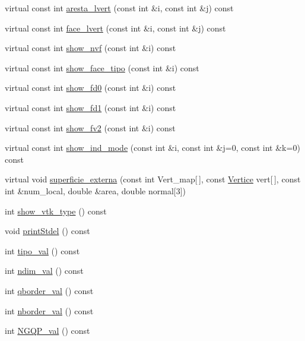 \begin{DoxyCompactItemize}
\item 
virtual const int \hyperlink{classTriangle_a55b14526652cdeaff82e07083c36a7ba}{aresta\+\_\+lvert} (const int \&i, const int \&j) const
\item 
virtual const int \hyperlink{classTriangle_a54ef3345b002746852e4f2eb2f698ae2}{face\+\_\+lvert} (const int \&i, const int \&j) const
\item 
virtual const int \hyperlink{classTriangle_ad028de34010b57e995d0206f9257b37b}{show\+\_\+nvf} (const int \&i) const
\item 
virtual const int \hyperlink{classTriangle_a7f711afd182aa8bae52c8acfa4ce3690}{show\+\_\+face\+\_\+tipo} (const int \&i) const
\item 
virtual const int \hyperlink{classTriangle_a715ce8022208f6b23e980acced093e99}{show\+\_\+fd0} (const int \&i) const
\item 
virtual const int \hyperlink{classTriangle_a3635411b31e3fe7dbe226efe5de45094}{show\+\_\+fd1} (const int \&i) const
\item 
virtual const int \hyperlink{classTriangle_a89169103df31e2cbe4383617363e48de}{show\+\_\+fv2} (const int \&i) const
\item 
virtual const int \hyperlink{classTriangle_ac61acf91a02fd588a70bf75d3e246129}{show\+\_\+ind\+\_\+mode} (const int \&i, const int \&j=0, const int \&k=0) const
\item 
virtual void \hyperlink{classTriangle_a1067d23aa0cc1580d0deed90f4cf3d37}{superficie\+\_\+externa} (const int Vert\+\_\+map\mbox{[}$\,$\mbox{]}, const \hyperlink{structVertice}{Vertice} vert\mbox{[}$\,$\mbox{]}, const int \&num\+\_\+local, double \&area, double normal\mbox{[}3\mbox{]})
\item 
int \hyperlink{classStdel_a56288a857b95a55c8b7eb5b473e836d9}{show\+\_\+vtk\+\_\+type} () const
\item 
void \hyperlink{classStdel_a54b5768d09f500cb949e66fc234eac70}{print\+Stdel} () const
\item 
int \hyperlink{classStdel_a75023fc369db2752845a9ce278f10929}{tipo\+\_\+val} () const
\item 
int \hyperlink{classStdel_a383df930bee8dc298d7d412b3b632ebb}{ndim\+\_\+val} () const
\item 
int \hyperlink{classStdel_a457d20e34fb7a32eb1e4aca6c19f53a2}{qborder\+\_\+val} () const
\item 
int \hyperlink{classStdel_aac8e97661e46c48fafa91f13caa03a9f}{nborder\+\_\+val} () const
\item 
int \hyperlink{classStdel_a2f964819235e0a55fd60733518b592f2}{N\+G\+Q\+P\+\_\+val} () const

\end{DoxyCompactItemize}
